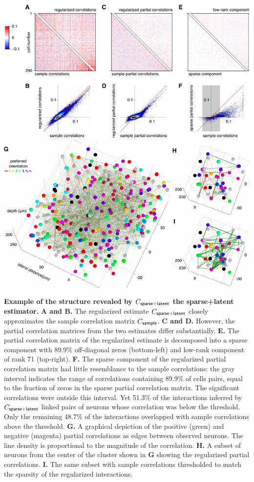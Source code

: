 \documentclass[10pt]{article}
\begin{document}
\begin{FPfigure}
    \begin{center}
        \includegraphics[width=17.35cm]{./figures/Figure04.pdf}
    \end{center}
    \caption{{\bf Example of the structure revealed by $C_{\sf sparse+latent}$ the sparse+latent estimator.}
    {\bf A and B.} The regularized estimate $C_{\sf sparse+latent}$ closely approximates the sample correlation matrix $C_{\sf sample}$. 
    {\bf C and D.} However, the partial correlation matrices from the two estimates differ substantially.
    {\bf E.} The partial correlation matrix of the regularized estimate is decomposed into a sparse component with 89.9\% off-diagonal zeros (bottom-left) and low-rank component of rank 71 (top-right).
    {\bf F.} The sparse component of the regularized partial correlation matrix had little resemblance to the sample correlations: the gray interval indicates the range of correlations containing 89.9\% of cells pairs, equal to the fraction of zeros in the sparse partial correlation matrix. The significant correlations were outside this interval. Yet 51.3\% of the interactions inferred by $C_{\sf sparse+latent}$  linked pairs of neurons whose correlation was below the threshold. Only the remaining 48.7\% of the interactions overlapped with sample correlations above the threshold.
    {\bf G.} A graphical depiction of the positive (green) and negative (magenta) partial correlations as edges between observed neurons. The line density is proportional to the magnitude of the correlation.
    {\bf H.} A subset of neurons from the center of the cluster shown in {\bf G} showing the regularized partial correlations.
    {\bf I.} The same subset with sample correlations thresholded to match the sparsity of the regularized interactions.
}
\label{fig:4}
\end{FPfigure}
\end{document}
